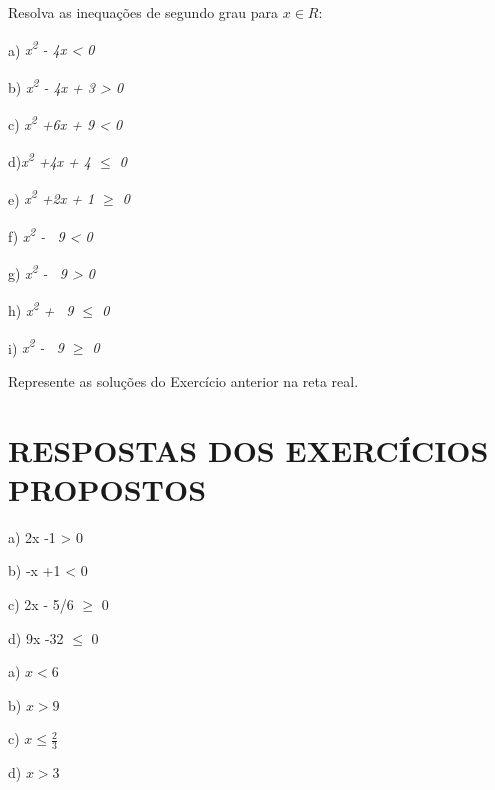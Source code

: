 \begin{exercicios}
	\exitem{} Resolva as inequações de segundo grau para $x \in R $:

	a) \textit{x\textsuperscript{2} - 4x < 0}

	b) \textit{x\textsuperscript{2} - 4x + 3 > 0}

	c) \textit{x\textsuperscript{2} +6x + 9 < 0}

    d)\textit{x\textsuperscript{2} +4x + 4 $ \leq $  0}

    e) \textit{ x\textsuperscript{2} +2x + 1 $ \geq $  0}

    f)\textit{  x\textsuperscript{2} -~ 9 < 0}

    g) \textit{x\textsuperscript{2} -~ 9 > 0}

    h) \textit{x\textsuperscript{2} +~ 9 $ \leq $ 0}

    i) \textit{x\textsuperscript{2} -~ 9 $ \geq $  0}
	\item Represente as soluções do Exercício anterior na reta real.
\end{exercicios}

\section{RESPOSTAS DOS EXERCÍCIOS PROPOSTOS}

\begin{respostas}{2}





    \ansitem{}
    a) 2x -1 > 0
    
    b) -x +1 < 0
    
    c) 2x - 5/6 $ \geq $  0
    
    d) 9x -32 $ \leq $ 0

    \ansitem{}
    a) $x < 6$
    
    b) $x > 9$
    
    c) $x \leq \frac{2}{3}$
    
    d) $x > 3$
\end{respostas}

